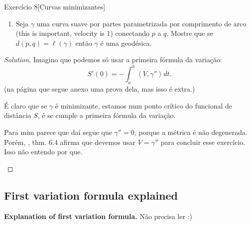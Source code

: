 \begin{thing4}{Exercício 8}[Curvas minimizantes]\label{exer:8}\leavevmode
\begin{enumerate}[label=(\alph*)]
\item Seja \(\gamma\) uma curva suave por partes parametrizada por comprimento de arco (this is important, velocity is 1) conectando \(p\) a \(q\). Mostre que se \(d(p,q)=\ell(\gamma)\) então \(\gamma\) é uma geodésica.
\end{enumerate}
\end{thing4}

\begin{proof}[Solution]\leavevmode
Imagino que podemos só usar a primeira fórmula da variação:
\[S'(0)=-\int_a^b \left<V,\gamma''\right>dt.\]
(na página que segue anexo uma prova dela, mas isso é extra.)

É claro que se \(\gamma\) é minimizante, estamos num ponto crítico do funcional de distância \(S\), é se cumple a primeira fórmula da variação.

\begin{question}\leavevmode
Para mim parece que daí segue que \(\gamma''=0\), porque a métrica é não degenerada. Porém, \cite{ler}, thm. 6.4 afirma que devemos usar \(V=\gamma''\) para concluir esse exercício. Isso não entendo por que.
\end{question}
\end{proof}

\subsection{First variation formula explained}
\textbf{Explanation of first variation formula.} Não precisa ler :)

